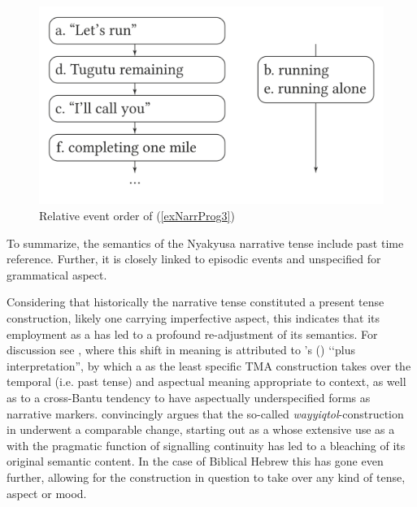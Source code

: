 \begin{figure}[hbt]
	\begin{center}
		\includegraphics{figures/GrafikRelativeOrderHareTugutu.png}
		\caption{Relative event order of (\ref{exNarrProg3})}
		\label{FigureRelativeOrderProgressives2}
	\end{center}
\end{figure}

To summarize, the semantics of the Nyakyusa narrative tense include past time reference. Further, it is closely linked to episodic events and unspecified for grammatical aspect.

Considering that historically the narrative tense constituted a present tense construction, likely one carrying imperfective aspect, this indicates that its employment as a  has led to a profound re-adjustment of its semantics. For discussion see \citet{PersohnB2016}, where this shift in meaning is attributed to \citeauthor{FleischmanS1990}'s (\citeyear{FleischmanS1990}) \lq\lq plus interpretation'', by which a  as the least specific TMA construction takes over the temporal (i.e. past tense) and aspectual meaning appropriate to context, as well as to a cross-Bantu tendency to have aspectually underspecified forms as narrative markers. \citet{RobarE2014} convincingly argues that the so-called \textit{wayyiqtol}-construction in  underwent a comparable change, starting out as a  whose extensive use as a  with the pragmatic function of signalling continuity has led to a bleaching of its original semantic content. In the case of Biblical Hebrew this has gone even further, allowing for the construction in question to take over any kind of tense, aspect or mood.
